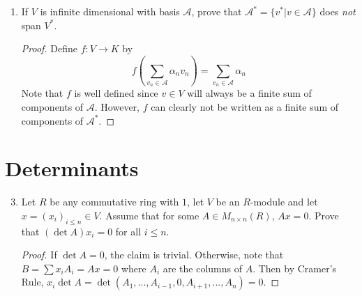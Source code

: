 \documentclass{report}
\DeclareMathOperator{\An}{Ann}
\DeclareMathOperator{\spa}{span}
\begin{document}
\begin{enumerate}
\begin{enumerate} [label=(\alph*)]
\begin{proof}
				\end{proof}
			\item Prove that the annihilator of $S$ is the same as the annihilator of the subspace of $V^*$ spanned by $S$.
				\begin{proof}
					Let $W=\spa S$. That $\An(W)\subseteq \An(S)$ is trivial. Conversely, let $w\sum\lambda_is_i\in W$ where each $s_i\in S$ and $\lambda_i\in K$.
					Then for any $v\in \An(S)$,
					$$w(v)=\sum\lambda s_i(v)=0$$
					so $v\in \An(W)$ as well.
				\end{proof}
			\item Assume $V$ is finite dimensional with basis $v_1,...,v_n$. Prove that if $S=\{v^*_1,...,v^*_k\}$ for some $k\leq n$, then $\An(S)=\spa\{v_{k+1},...,v_n\}$.
				\begin{proof}
					$$v\in\An(S)\iff v^*_i(v)=0 \text{ for all }i\leq k\iff v\in \spa\{v^*_{k+1},...,v^*_n\}.$$
				\end{proof}
			\item Assume $V$ is finite dimensional. Prove that if $W^*$ is any subspace of $V^*$ then $\dim \An(W^*)=\dim V - \dim W^*$.
				\begin{proof}
					Pick a basis $v_1^*,...,v^*_k$ for $W^*$ and extend it to a basis $v_1^*,...,v^*_n$ for $V^*$.
					Then the claim follows immediately from (e).
				\end{proof}
				
		\end{enumerate}
	\item If $V$ is infinite dimensional with basis $\mathcal{A}$, prove that $\mathcal{A}^*=\{v^*|v\in\mathcal{A}\}$ does \textit{not} span $V^*$.
		\begin{proof}
			Define $f:V\to K$ by
			$$f\left(\sum_{v_n\in\mathcal{A}}\alpha_nv_n\right)=\sum_{v_n \in\mathcal{A}}\alpha_n$$
			Note that $f$ is well defined since $v\in V$ will always be a finite sum of components of $\mathcal{A}$.
			However, $f$ can clearly not be written as a finite sum of components of $\mathcal{A}^*$.
		\end{proof}
\end{enumerate}

\section{Determinants}
\begin{enumerate} 
	\setcounter{enumi}{2}
	\item Let $R$ be any commutative ring with $1$, let $V$ be an $R$-module and let $x=(x_i)_{i\leq n}\in V$.
		Assume that for some $A\in M_{n\times n}(R)$, $Ax = 0$. Prove that $(\det A)x_i=0$ for all $i\leq n$.
		\begin{proof}
			If $\det A=0$, the claim is trivial. Otherwise, note that $B=\sum x_iA_i=Ax=0$ where $A_i$ are the columns of $A$.
			Then by Cramer's Rule, $x_i\det A=\det(A_1,...,A_{i-1},0,A_{i+1},...,A_n)=0$.
		\end{proof}
		
\end{enumerate}
\end{document}
